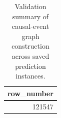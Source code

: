 \begin{table}
\caption{Validation summary of causal-event graph construction across saved prediction instances.}
\label{tab:causal_event_validation}
\begin{tabular}{r}
\toprule
row_number \\
\midrule
121547 \\
\bottomrule
\end{tabular}
\end{table}

